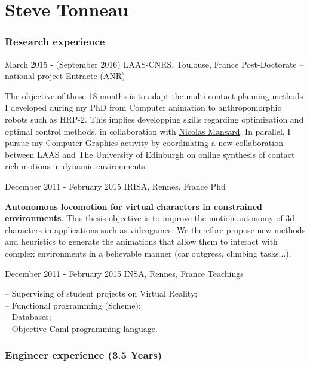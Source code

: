 \documentclass{tccv}
\begin{document}
\part{Steve Tonneau}

\section{Research experience}

\begin{eventlist}

\item{ March 2015 - (September 2016)}
     {LAAS-CNRS, Toulouse, France}
     {Post-Doctorate -- national project Entracte (ANR)}
     
     The objective of those 18 months is to adapt the multi contact planning methods I developed 
     during my PhD from Computer animation to anthropomorphic robots such as HRP-2.
     This implies developping skills regarding optimization and optimal control methods, in collaboration with \href{http://projects.laas.fr/gepetto/index.php/Members/NicolasMansard}{Nicolas Mansard}.
     In parallel, I pursue my Computer Graphics activity by coordinating a new collaboration between LAAS and The University of Edinburgh on online
     synthesis of contact rich motions in dynamic environments.

\item{December 2011 - February 2015}
     {IRISA, Rennes, France}
     {Phd}
	 
 \textbf{Autonomous locomotion for virtual characters in constrained environments}.
 This thesis objective is to improve the motion autonomy of 3d characters in applications such as videogames.
We therefore propose new methods and heuristics to generate the animations that allow them to interact with complex environments in a believable manner (car outgress, climbing tasks...).


\item{December 2011 - February 2015}
     {INSA, Rennes, France}
     {Teachings}

-- Supervising of student projects on Virtual Reality;
\\-- Functional programming (Scheme);
\\ -- Databases;
\\ -- Objective Caml programming language.

\end{eventlist}


\section{Engineer experience (3.5 Years)}
\end{document}
